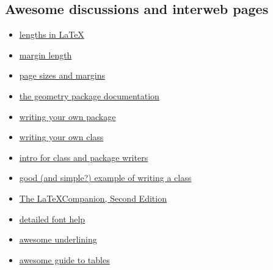 \documentclass[12pt]{article}
\begin{document}
\subsection{Awesome discussions and interweb pages}
\begin{itemize}
\item \href{https://en.wikibooks.org/wiki/LaTeX/Lengths}{lengths in \LaTeX}
\item \href{https://tex.stackexchange.com/questions/71172/why-are-default-latex-margins-so-big}{margin length}
\item \href{https://www.overleaf.com/learn/latex/Page_size_and_margins}{page sizes and margins}
\item \href{http://www.texdoc.net/texmf-dist/doc/latex/geometry/geometry.pdf}{the geometry package documentation}
\item \href{https://www.overleaf.com/learn/latex/Writing_your_own_package}{writing your own package}
\item \href{https://www.overleaf.com/learn/latex/Writing_your_own_class}{writing your own class}
\item \href{https://www.latex-project.org/help/documentation/clsguide.pdf}{intro for class and package writers}
\item \href{http://tutex.tug.org/pracjourn/2005-4/hefferon/hefferon.pdf}{good (and simple?) example of writing a class}
\item \href{http://ptgmedia.pearsoncmg.com/images/9780201362992/samplepages/0201362996.pdf}{The \LaTeX Companion, Second Edition}
\item \href{https://www.ee.iitb.ac.in/~trivedi/LatexHelp/latexfont.htm}{detailed font help}
\item \href{https://alexwlchan.net/2017/10/latex-underlines/}{awesome underlining}
\item \href{https://www.tug.org/pracjourn/2007-1/mori/mori.pdf}{awesome guide to tables}
\end{itemize}
\end{document}
